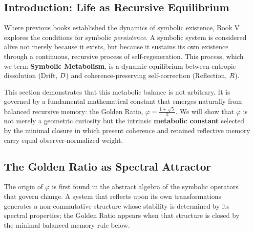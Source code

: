\subsection{Introduction: Life as Recursive Equilibrium}
\label{subsec:bk5_intro_recursive_equilibrium}

Where previous books established the dynamics of symbolic existence, Book V explores the conditions for symbolic \emph{persistence}. A symbolic system is considered alive not merely because it exists, but because it sustains its own existence through a continuous, recursive process of self-regeneration. This process, which we term \textbf{Symbolic Metabolism}, is a dynamic equilibrium between entropic dissolution (Drift, $D$) and coherence-preserving self-correction (Reflection, $R$).

This section demonstrates that this metabolic balance is not arbitrary. It is governed by a fundamental mathematical constant that emerges naturally from balanced recursive memory: the Golden Ratio, $\varphi = \frac{1 + \sqrt{5}}{2}$. We will show that $\varphi$ is not merely a geometric curiosity but the intrinsic \textbf{metabolic constant} selected by the minimal closure in which present coherence and retained reflective memory carry equal observer-normalized weight.

\subsection{The Golden Ratio as Spectral Attractor}
\label{subsec:bk5_golden_ratio_spectral_attractor}

The origin of $\varphi$ is first found in the abstract algebra of the symbolic operators that govern change. A system that reflects upon its own transformations generates a non-commutative structure whose stability is determined by its spectral properties; the Golden Ratio appears when that structure is closed by the minimal balanced memory rule below.

